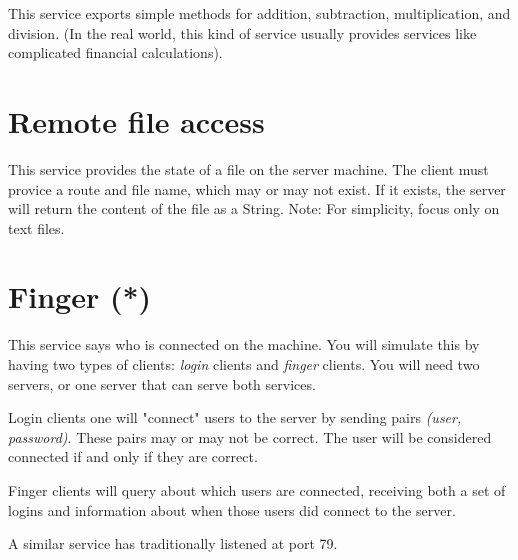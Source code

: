 \documentclass{article}
\begin{document}
This service exports simple methods for addition, subtraction, multiplication, 
and division. (In the real world, this kind of service usually provides services
like complicated financial calculations). 

\section{Remote file access}
\label{sec:remote-file-access}

This service provides the state of a file on the server machine. The client must
provice a route and file name, which may or may not exist. If it exists, the 
server will return the content of the file as a String. Note: For simplicity, focus 
only on text files. 

\section{Finger (*)}
\label{sec:finger}

This service says who is connected on the machine. You will simulate
this by having two types of clients: \emph{login} clients and
\emph{finger} clients. You will need two servers, or one server that
can serve both services.

Login clients one will "connect" users to the server by sending pairs 
\emph{(user, password)}. These pairs may or may not be correct. The
user will be considered connected if and only if they are correct. 

Finger clients will query about which users are connected, receiving
both a set of logins and information about when those users did
connect to the server. 

A similar service has traditionally listened at port 79.
\end{document}
